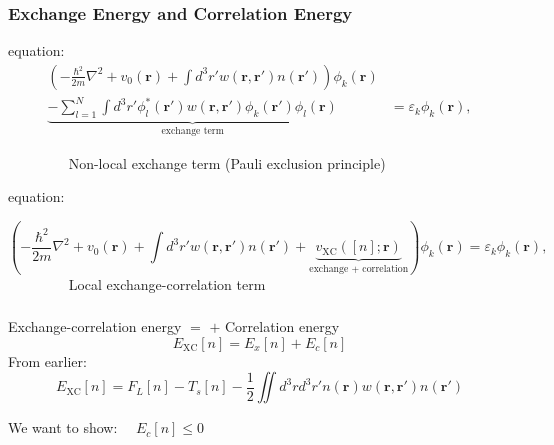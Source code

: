 \documentclass[compress]{beamer}
\begin{document}
\frame
{ 
  \frametitle{Exchange Energy and Correlation Energy}
  \begin{small}
    {\scriptsize

       equation:
      \begin{align}
        \left(-\frac{\hbar^{2}}{2m}\nabla^{2}+v_{0}(\mathbf{r})+\int d^{3}r'w(\mathbf{r},\mathbf{r}')n(\mathbf{r}')\right)\phi_{k}(\mathbf{r})& \nonumber \\
        \underbrace{-\sum_{l=1}^{N}\int d^{3}r'\phi_{l}^{*}(\mathbf{r}')w(\mathbf{r},\mathbf{r}')\phi_{k}(\mathbf{r}')\phi_{l}(\mathbf{r})}_{\text{exchange term}}
        &=\varepsilon_{k}\phi_{k}(\mathbf{r}), \nonumber
      \end{align}
      
      $\qquad \qquad $ \alert{Non-local} exchange term (Pauli exclusion principle)

      \vspace{5mm}     
       equation:

      \begin{equation}
         \left(-\frac{\hbar^{2}}{2m}\nabla^{2}+v_{0}(\mathbf{r})
           +\int d^{3}r'w(\mathbf{r},\mathbf{r}')n(\mathbf{r}')
           +\underbrace{v_{\mathrm{XC}}([n];\mathbf{r})}_{\text{exchange + correlation}}
         \right)\phi_{k}(\mathbf{r})=\varepsilon_{k}\phi_{k}(\mathbf{r}), \nonumber
       \end{equation}
       $\qquad \qquad $  \alert{Local} exchange-correlation term
      
    }
  \end{small}
}

\frame
{ 
  \frametitle{}
  \begin{small}
    {\scriptsize
      Exchange-correlation energy $=$  $+$ \alert{Correlation energy}
      \begin{equation}
        E_{\mathrm{XC}}[n]=E_{x}[n]+E_{c}[n] \nonumber
      \end{equation}
      From earlier: 
      \begin{equation}
        E_{\mathrm{XC}}[n]=F_{L}[n]-T_{s}[n]-\frac{1}{2}\iint d^{3}r d^{3}r' n(\mathbf{r})w(\mathbf{r},\mathbf{r}')n(\mathbf{r}') \nonumber
      \end{equation}
      \vspace{10mm}
      \begin{center}
        We want to show: $\quad $$E_{c}[n]\leq 0$
      \end{center}
    }
  \end{small}
}
\end{document}
